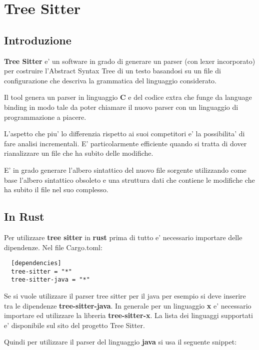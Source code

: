 \chapter{Tree Sitter}

\section{Introduzione}

\textbf{Tree Sitter} \cite{tree_sitter} e' un software in grado di generare un parser (con lexer incorporato) per costruire l'Abstract Syntax Tree di un testo basandosi su un file di configurazione che descriva la grammatica del linguaggio considerato.

Il tool genera un parser in linguaggio \textbf{C} e del codice extra che funge da language binding in modo tale da poter chiamare il nuovo parser con un linguaggio di programmazione a piacere.

L'aspetto che piu' lo differenzia rispetto ai suoi competitori e' la possibilita' di fare analisi incrementali.
E' particolarmente efficiente quando si tratta di dover rianalizzare un file che ha subito delle modifiche.

E' in grado generare l'albero sintattico del nuovo file sorgente utilizzando come base l'albero sintattico obsoleto e una struttura dati che contiene le modifiche che ha subito il file nel suo complesso.

\section{In Rust}

Per utilizzare \textbf{tree sitter} in \textbf{rust} prima di tutto e' necessario importare delle dipendenze. Nel file Cargo.toml:

\begin{verbatim}
  [dependencies]
  tree-sitter = "*"
  tree-sitter-java = "*"
\end{verbatim}

Se si vuole utilizzare il parser tree sitter per il java per esempio si deve inserire tra le dipendenze \textbf{tree-sitter-java}.
In generale per un linguaggio \textbf{x} e' necessario importare ed utilizzare la libreria \textbf{tree-sitter-x}.
La lista dei linguaggi supportati e' disponibile sul sito del progetto Tree Sitter.

Quindi per utilizzare il parser del linguaggio \textbf{java} si usa il seguente snippet:

